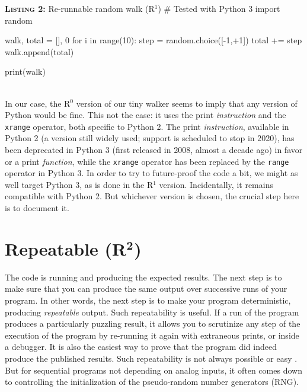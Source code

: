 \documentclass[a4paper,11pt]{article}
\begin{document}
\noindent \begin{minipage}[c]{\linewidth}
\begin{code}{\textbf{\textsc{Listing 2:}} Re-runnable random walk (R$^1$)}
# Tested with Python 3
import random

walk, total = [], 0
for i in range(10):
    step = random.choice([-1,+1])
    total += step
    walk.append(total)

print(walk)
\end{code}
\end{minipage}\\

In our case, the R$^0$ version of our tiny walker seems to imply that any version of Python would be fine. This not the case: it uses the print {\em instruction} and the {\tt xrange} operator, both specific to Python 2. The print {\em instruction}, available in Python 2 (a version still widely used; support is scheduled to stop in 2020), has been deprecated in Python 3 (first released in 2008, almost a decade ago) in favor or a  print {\em function}, while the {\tt xrange} operator has been replaced by the {\tt range} operator in Python 3. In order to try to future-proof the code a bit, we might as well target Python 3, as is done in the R$^1$ version. Incidentally, it remains compatible with Python 2. But whichever version is chosen, the crucial step here is to document it.


\section*{Repeatable (R$^{\mathbf 2}$)}

The code is running and producing the expected results. The next step is to make sure that you can produce the same output over successive runs of your program. In other words, the next step is to make your program deterministic, producing {\em repeatable} output. Such repeatability is useful. If a run of the program produces a particularly puzzling result, it allows you to scrutinize any step of the execution of the program by re-running it again with extraneous prints, or inside a debugger. It is also the easiest way to prove that the program did indeed produce the published results. Such repeatability is not always possible or easy \citep{Diethelm:2012, Courtes:2015}. But for sequential programs not depending on analog inputs, it often comes down to controlling the initialization of the pseudo-random number generators (RNG).\\
\end{document}
